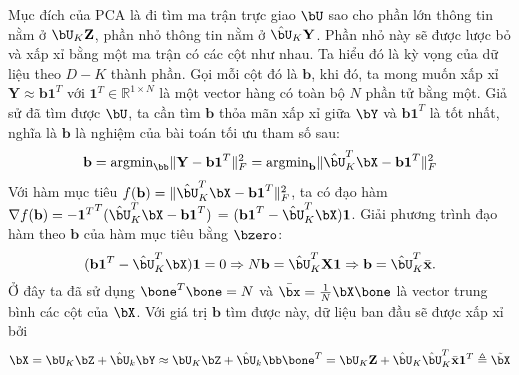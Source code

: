 Mục đích của PCA là đi tìm ma trận trực giao $\bU$ sao cho phần lớn thông tin
nằm ở $\bU_K \mathbf{Z}$, phần nhỏ thông tin nằm ở $\hat{\bU}_K\mathbf{Y}$.
Phần nhỏ này sẽ được lược bỏ và xấp xỉ bằng một ma trận có các
cột như nhau. Ta hiểu đó là kỳ vọng của dữ liệu theo $D-K$ thành phần. Gọi mỗi cột đó là
$\mathbf{b}$, khi đó, ta mong muốn xấp xỉ $\mathbf{Y} \approx
\mathbf{b1}^T$ với $\mathbf{1}^T\in \mathbb{R}^{1
	\times N}$ là một vector hàng có toàn
bộ $N$ phần tử bằng một. Giả sử đã tìm được $\bU$, ta cần tìm $\mathbf{b}$ thỏa mãn xấp xỉ giữa $\bY$ và $\mathbf{b1}^T$ là tốt nhất, nghĩa là $\mathbf{b}$ là nghiệm của bài toán tối ưu tham số sau:
\begin{equation}
\mathbf{b} = \text{argmin}_{\bb} \|\mathbf{Y} - \mathbf{b1}^T\|_F^2 =
\text{argmin}_{\mathbf{b}} \|\hat{\bU}_K^T\bX - \mathbf{b1}^T\|_F^2
\end{equation}
Với hàm mục tiêu $f(\mathbf{b}) = \|\hat{\bU}_K^T\bX - \mathbf{b1}^T\|_F^2$, ta có đạo hàm $\nabla f(\mathbf{b}) = -{\mathbf{1}^T}^T(\hat{\bU}_K^T\bX - \mathbf{b1}^T)$ = $(\mathbf{b1}^T - \hat{\bU}_K^T\bX)\mathbf{1}$.
Giải phương trình đạo hàm theo $\mathbf{b}$ của hàm mục tiêu bằng $\bzero$:
\begin{equation}
(\mathbf{b1}^T - \hat{\bU}_K^T\bX)\mathbf{1} = 0 \Rightarrow N\mathbf{b} = \hat{\bU}_K^T \mathbf{X1} \Rightarrow \mathbf{b} = \hat{\bU}_K^T \bar{\mathbf{x}}.
\end{equation}
Ở đây ta đã sử dụng $\bone^T\bone = N$ và $\bar{\bx} = \frac{1}{N}\bX\bone$ là
vector trung bình các cột của $\bX$.
Với giá trị $\mathbf{b}$ tìm được này, dữ liệu ban đầu sẽ được xấp xỉ bởi
\begin{equation}
\label{eqn:27_10}
\bX = \bU_K \bZ + \hat{\bU}_k\bY \approx \bU_K\bZ + \hat{\bU}_k \bb\bone^T
= \bU_K \mathbf{Z} + \hat{\bU}_K \hat{\bU}_K^T\bar{\mathbf{x}}\mathbf{1}^T
\triangleq \tilde{\bX}
\end{equation}

